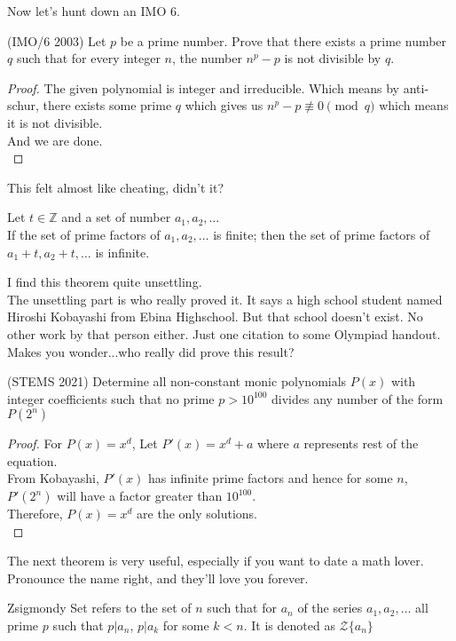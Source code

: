 Now let's hunt down an IMO 6.\\
\begin{example}
    (IMO/6 2003) Let $p$ be a prime number. Prove that there exists a prime number $q$ such that for every integer $n$, the number $n^p - p$ is not divisible by $q$.
\end{example}
\begin{proof}
    The given polynomial is integer and irreducible. Which means by anti-schur, there exists some prime $q$ which gives us $n^p-p \not\equiv 0 \pmod{q}$ which means it is not divisible.\\
    And we are done.\\
\end{proof}
This felt almost like cheating, didn't it?\\
\begin{theorem}
    Let $t \in \mathbb{Z}$ and a set of number $a_1,a_2,\dots$\\
    If the set of prime factors of $a_1,a_2,\dots$ is finite; then the set of prime factors of $a_1+t,a_2+t,\dots$ is infinite.
\end{theorem}
I find this theorem quite unsettling.\\
The unsettling part is who really proved it. It says a high school student named Hiroshi Kobayashi from Ebina Highschool. But that school doesn't exist. No other work by that person either. Just one citation to some Olympiad handout. Makes you wonder...who really did prove this result?\\
\begin{example}
    (STEMS 2021) Determine all non-constant monic polynomials $P(x)$ with integer coefficients such that no prime $p>10^{100}$ divides any number of the form $P(2^n)$
\end{example}
\begin{proof}
    For $P(x)=x^d$, Let $P'(x)=x^d+a$ where $a$ represents rest of the equation.\\
    From Kobayashi, $P'(x)$ has infinite prime factors and hence for some $n$, $P'(2^n)$ will have a factor greater than $10^100$.\\
    Therefore, $P(x)=x^d$ are the only solutions.\\
\end{proof}
The next theorem is very useful, especially if you want to date a math lover. Pronounce the name right, and they'll love you forever.\\
\begin{definition}
    Zsigmondy Set refers to the set of $n$ such that for $a_n$ of the series $a_1, a_2, \dots $ all prime $p$ such that $p|a_n$, $p|a_k$ for some $k<n$. It is denoted as $\mathcal{Z}\{a_n\}$\\
\end{definition}
